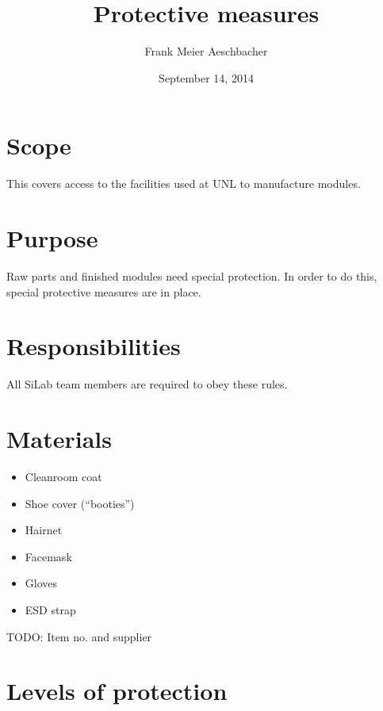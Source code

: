 \documentclass[12pt]{unlsilabsop}
\title{Protective measures}
\date{September 14, 2014}
\author{Frank Meier Aeschbacher}
\begin{document}
\maketitle

\section{Scope}
This covers access to the facilities used at UNL to manufacture modules.

\section{Purpose}
Raw parts and finished modules need special protection. In order to do this, special protective measures are in place.


\section{Responsibilities}
All SiLab team members are required to obey these rules.

\section{Materials}
\begin{itemize}
    \item Cleanroom coat
    \item Shoe cover (``booties'')
    \item Hairnet
    \item Facemask
    \item Gloves
    \item ESD strap
\end{itemize}
TODO: Item no. and supplier

\section{Levels of protection}
\end{document}
